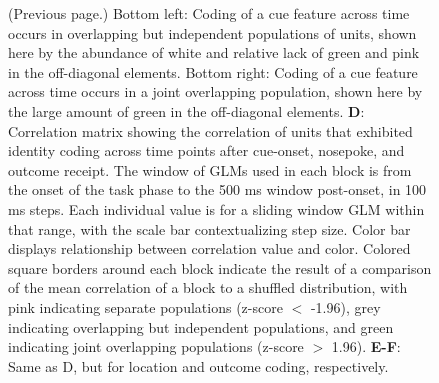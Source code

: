 \documentclass[11pt]{article}
\newcommand{\bsf}[1]{\textbf{#1}}
\begin{document}
\addtocounter{figure}{-1}
\begin{figure} [t!]
  \caption{(Previous page.) {\color{red} Bottom left: Coding of a cue feature across time occurs in overlapping but independent populations of units, shown here by the abundance of white and relative lack of green and pink in the off-diagonal elements. Bottom right: Coding of a cue feature across time occurs in a joint overlapping population, shown here by the large amount of green in the off-diagonal elements. \bsf{D}: Correlation matrix showing the correlation of units that exhibited identity coding across time points after cue-onset, nosepoke, and outcome receipt. The window of GLMs used in each block is from the onset of the task phase to the 500 ms window post-onset, in 100 ms steps. Each individual value is for a sliding window GLM within that range, with the scale bar contextualizing step size. Color bar displays relationship between correlation value and color. Colored square borders around each block indicate the result of a comparison of the mean correlation of a block to a shuffled distribution, with pink indicating separate populations (z-score $<$ -1.96), grey indicating overlapping but independent populations, and green indicating joint overlapping populations (z-score $>$ 1.96). \bsf{E-F}: Same as D, but for location and outcome coding, respectively.}}
\end{figure}
\end{document}
